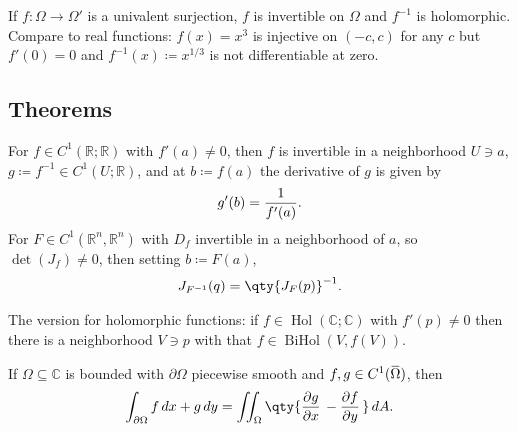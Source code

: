 \begin{remark}

If \(f: \Omega \to \Omega'\) is a univalent surjection, \(f\) is
invertible on \(\Omega\) and \(f^{-1}\) is holomorphic. Compare to real
functions: \(f(x) = x^3\) is injective on \((-c, c)\) for any \(c\) but
\(f'(0) = 0\) and \(f^{-1}(x) \coloneqq x^{1/3}\) is not differentiable
at zero.

\end{remark}

\hypertarget{theorems}{%
\subsection{Theorems}\label{theorems}}

\begin{theorem}

\end{theorem}

\begin{theorem}

For \(f \in C^1({\mathbb{R}}; {\mathbb{R}})\) with \(f'(a) \neq 0\),
then \(f\) is invertible in a neighborhood \(U \ni a\),
\(g\coloneqq f^{-1}\in C^1(U; {\mathbb{R}})\), and at
\(b\coloneqq f(a)\) the derivative of \(g\) is given by
\begin{align*}
g'(b) = {1 \over f'(a)}
.\end{align*}
For \(F \in C^1({\mathbb{R}}^n, {\mathbb{R}}^n)\) with \(D_f\)
invertible in a neighborhood of \(a\), so \(\det(J_f)\neq 0\), then
setting \(b\coloneqq F(a)\),
\begin{align*}
J_{F^{-1}}(q) = \qty{J_F(p)}^{-1}
.\end{align*}

The version for holomorphic functions: if
\(f\in \mathop{\mathrm{Hol}}({\mathbb{C}}; {\mathbb{C}})\) with
\(f'(p)\neq 0\) then there is a neighborhood \(V\ni p\) with that
\(f\in \mathop{\mathrm{BiHol}}(V, f(V))\).

\end{theorem}

\begin{theorem}

If \(\Omega \subseteq {\mathbb{C}}\) is bounded with
\({{\partial}}\Omega\) piecewise smooth and
\(f, g\in C^1(\mkern 1.5mu\overline{\mkern-1.5mu\Omega\mkern-1.5mu}\mkern 1.5mu)\),
then
\begin{align*}\int_{{{\partial}}\Omega} f\, dx + g\, dy = \iint_{\Omega} \qty{ {\frac{\partial g}{\partial x}\,} - {\frac{\partial f}{\partial y}\,} } \, dA.\end{align*}

\end{theorem}

